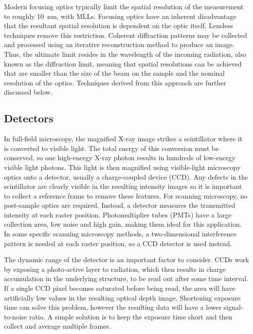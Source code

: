 \documentclass[journal=cmatex,manuscript=perspective]{achemso}
\begin{document}
Modern focusing optics typically limit the spatial resolution of the
measurement to roughly \SI{10}{nm}, with MLLs\cite{yan2014}. Focusing
optics have an inherent disadvantage that the resultant spatial
resolution is dependent on the optic itself. Lensless techniques
remove this restriction. Coherent diffraction patterns may be
collected and processed using an iterative reconstruction method to
produce an image. Thus, the ultimate limit resides in the wavelength
of the incoming radiation, also known as the diffraction limit,
meaning that spatial resolutions can be achieved that are smaller than
the size of the beam on the sample and the nominal resolution of the
optics. Techniques derived from this approach are further discussed
below.

\subsection{Detectors}

In full-field microscopy, the magnified X-ray image strikes a
scintillator where it is converted to visible light. The total energy
of this conversion must be conserved, so one high-energy X-ray photon
results in hundreds of low-energy visible light photons. This light is
then magnified using visible-light microscopy optics onto a detector,
usually a charge-coupled device (CCD). Any defects in the scintillator
are clearly visible in the resulting intensity images so it is
important to collect a reference frame to remove these features. For
scanning microscopy, no post-sample optics are required. Instead, a
detector measures the transmitted intensity at each raster
position. Photomultiplier tubes (PMTs) have a large collection area,
low noise and high gain, making them ideal for this application. In
some specific scanning microscopy methods, a two-dimensional
interference pattern is needed at each raster position, so a CCD
detector is used instead.

The dynamic range of the detector is an important factor to
consider. CCDs work by exposing a photo-active layer to radiation,
which then results in charge accumulation in the underlying structure,
to be read out after some time interval. If a single CCD pixel becomes
saturated before being read, the area will have artificially low
values in the resulting optical depth image. Shortening exposure time
can solve this problem, however the resulting data will have a lower
signal-to-noise ratio. A simple solution is to keep the exposure time
short and then collect and average multiple frames.
\end{document}
